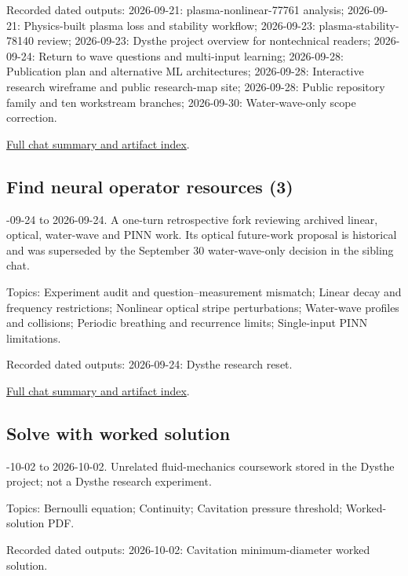 \documentclass[11pt]{article}
\begin{document}
\noindent Recorded dated outputs: 2026-09-21: plasma-nonlinear-77761 analysis; 2026-09-21: Physics-built plasma loss and stability workflow; 2026-09-23: plasma-stability-78140 review; 2026-09-23: Dysthe project overview for nontechnical readers; 2026-09-24: Return to wave questions and multi-input learning; 2026-09-28: Publication plan and alternative ML architectures; 2026-09-28: Interactive research wireframe and public research-map site; 2026-09-28: Public repository family and ten workstream branches; 2026-09-30: Water-wave-only scope correction.

\nopagebreak[4]
\noindent\href{https://github.com/matasvai/dysthe-research-map/blob/codex/research-record-2026-11-05/research-record/2026-11-05/CHATS.md#chat-01a0c41a-d01a-7d80-b1f4-affa0301232d}{Full chat summary and artifact index}.
\subsection*{Find neural operator resources (3)}
-09-24 to 2026-09-24. A one-turn retrospective fork reviewing archived linear, optical, water-wave and PINN work. Its optical future-work proposal is historical and was superseded by the September 30 water-wave-only decision in the sibling chat.\par
Topics: Experiment audit and question--measurement mismatch; Linear decay and frequency restrictions; Nonlinear optical stripe perturbations; Water-wave profiles and collisions; Periodic breathing and recurrence limits; Single-input PINN limitations.

\noindent Recorded dated outputs: 2026-09-24: Dysthe research reset.

\nopagebreak[4]
\noindent\href{https://github.com/matasvai/dysthe-research-map/blob/codex/research-record-2026-11-05/research-record/2026-11-05/CHATS.md#chat-01a0d3c1-8b31-7053-a8b3-67fea056e40a}{Full chat summary and artifact index}.
\subsection*{Solve with worked solution}
-10-02 to 2026-10-02. Unrelated fluid-mechanics coursework stored in the Dysthe project; not a Dysthe research experiment.\par
Topics: Bernoulli equation; Continuity; Cavitation pressure threshold; Worked-solution PDF.

\noindent Recorded dated outputs: 2026-10-02: Cavitation minimum-diameter worked solution.
\end{document}
